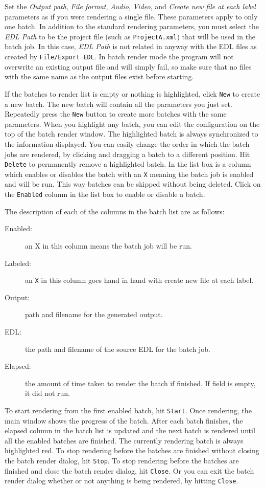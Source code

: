Set the \textit{Output path}, \textit{File format}, \textit{Audio}, \textit{Video}, and \textit{Create new file at each label} parameters as if you were rendering a single file.  These parameters apply to only one batch.  In addition to the standard rendering parameters, you must select the \textit{EDL Path} to be the project file (such as \texttt{ProjectA.xml}) that will be used in the batch job.  In this case, \textit{EDL Path} is not related in anyway with the EDL files as created by \texttt{File/Export EDL}.  In batch render mode the program will not overwrite an existing output file and will simply fail, so make sure that no files with the same name as the output files exist before starting.

If the batches to render list is empty or nothing is highlighted, click \texttt{New} to create a new batch. The new batch will contain all the parameters you just set.  Repeatedly press the \texttt{New} button to create more batches with the same parameters.  When you highlight any batch, you can edit the configuration on the top of the batch render window. The highlighted batch is always synchronized to the information displayed.  You can easily change the order in which the batch jobs are rendered, by clicking and dragging a batch to a different position.  Hit \texttt{Delete} to permanently remove a highlighted batch. In the list box is a column which enables or disables the batch with an \texttt{X} meaning the batch job is enabled and will be run.  This way batches can be skipped without being deleted.  Click on the \texttt{Enabled} column in the list box to enable or disable a batch.

The description of each of the columns in the batch list are as follows:

\begin{description}
    \item[Enabled:] an X in this column means the batch job will be run.
    \item[Labeled:] an \texttt{X} in this column goes hand in hand with create new file at each label.
    \item[Output:] path and filename for the generated output.
    \item[EDL:] the path and filename of the source EDL for the batch job.
    \item[Elapsed:] the amount of time taken to render the batch if finished.  If field is empty, it did not run.
\end{description}
To start rendering from the first enabled batch, hit \texttt{Start}.  Once rendering, the main window shows the progress of the batch. After each batch finishes, the elapsed column in the batch list is updated and the next batch is rendered until all the enabled batches are finished.  The currently rendering batch is always highlighted red.  To stop rendering before the batches are finished without closing the batch render dialog, hit \texttt{Stop}.  To stop rendering before the batches are finished and close the batch render dialog, hit \texttt{Close}.  Or you can exit the batch render dialog whether or not anything is being rendered, by hitting \texttt{Close}.

